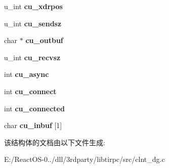 \begin{DoxyCompactItemize}
u\+\_\+int {\bfseries cu\+\_\+xdrpos}
\item 
\mbox{\label{structcu__data_a827876014bb55d2c2278e8d8ba89cf9a}} 
u\+\_\+int {\bfseries cu\+\_\+sendsz}
\item 
\mbox{\label{structcu__data_ad16c61a8174749f8f30bff1fb5399561}} 
char $\ast$ {\bfseries cu\+\_\+outbuf}
\item 
\mbox{\label{structcu__data_a49375259517bf9fdd72e2ea7df389ad1}} 
u\+\_\+int {\bfseries cu\+\_\+recvsz}
\item 
\mbox{\label{structcu__data_a65912bf9ca3d3e967263c9e248513bbf}} 
int {\bfseries cu\+\_\+async}
\item 
\mbox{\label{structcu__data_a06c017252d134c679bf06b6552916628}} 
int {\bfseries cu\+\_\+connect}
\item 
\mbox{\label{structcu__data_ad9076a8b5a5a317a986fd2b9d0d096d8}} 
int {\bfseries cu\+\_\+connected}
\item 
\mbox{\label{structcu__data_ad247db997b807c3e68d6227bfec80645}} 
char {\bfseries cu\+\_\+inbuf} \mbox{[}1\mbox{]}
\end{DoxyCompactItemize}


该结构体的文档由以下文件生成\+:\begin{DoxyCompactItemize}
\item 
E\+:/\+React\+O\+S-\/0../dll/3rdparty/libtirpc/src/clnt\+\_\+dg.\+c\end{DoxyCompactItemize}
